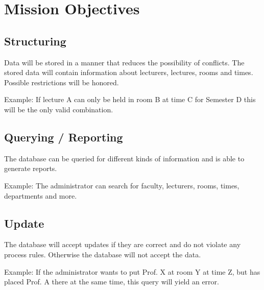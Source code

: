 \section{Mission Objectives}
\subsection{Structuring}
Data will be stored in a manner that reduces the possibility of conflicts. The stored data
will contain information about lecturers, lectures, rooms and times. Possible restrictions
will be honored.

Example: If lecture A can only be held in room B at time C for Semester D this will be the only valid combination.

\subsection{Querying / Reporting}
The database can be queried for different kinds of information and is able to generate reports.

Example: The administrator can search for faculty, lecturers, rooms, times, departments and more.

\subsection{Update}
The database will accept updates if they are correct and do not violate any process rules. Otherwise the database
will not accept the data.

Example: If the administrator wants to put Prof. X at room Y at time Z, but has placed Prof. A there at the same
time, this query will yield an error.
